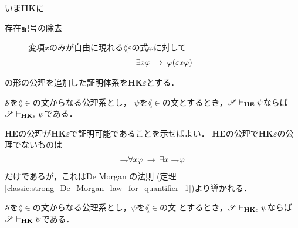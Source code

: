 	いま{\bf HK}に
	\begin{description}
		\item[存在記号の除去] 
			変項$x$のみが自由に現れる$\lang{\varepsilon}$の式$\varphi$に対して
			\begin{align}
				\exists x \varphi \hspace{0.25em}\rightarrow\hspace{0.25em} \varphi(\varepsilon x \varphi)
			\end{align}
	\end{description}
	の形の公理を追加した証明体系を{\bf HK$\varepsilon$}とする．
	
	\begin{screen}
		\begin{metathm}
		\label{metathm:Henkin_expansion_1}
			$\mathscr{S}$を$\lang{\in}$の文からなる公理系とし，
			$\psi$を$\lang{\in}$の文とするとき，$\mathscr{S} \vdash_{{\scriptsize \mbox{{\bf HE}}}} \psi$ならば
			$\mathscr{S} \vdash_{{\scriptsize \mbox{{\bf HK$\varepsilon$}}}} \psi$である．
		\end{metathm}
	\end{screen}
	
	\begin{metaprf}
		{\bf HE}の公理が{\bf HK$\varepsilon$}で証明可能であることを示せばよい．
		{\bf HE}の公理で{\bf HK$\varepsilon$}の公理でないものは
		\begin{align}
			\rightharpoondown\hspace{-0.25em} \forall x \varphi \hspace{0.25em}\rightarrow\hspace{0.25em} \exists x \rightharpoondown\hspace{-0.25em} \varphi
		\end{align}
		だけであるが，これはDe Morgan の法則
		(定理\ref{classic:strong_De_Morgan_law_for_quantifier_1})より導かれる．
		\QED
	\end{metaprf}
	
	\begin{screen}
		\begin{metathm}
		\label{metathm:Henkin_expansion_2}
			$\mathscr{S}$を$\lang{\in}$の文からなる公理系とし，$\psi$を$\lang{\in}$の文
			とするとき，$\mathscr{S} \vdash_{{\scriptsize \mbox{{\bf HK$\varepsilon$}}}} \psi$ならば
			$\mathscr{S} \vdash_{{\scriptsize \mbox{{\bf HK}}}} \psi$である．
		\end{metathm}
	\end{screen}
	

